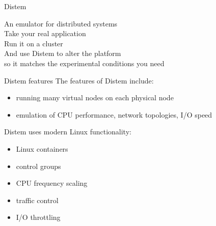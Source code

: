 \documentclass[11pt,xcolor=dvipsnames,presentation]{beamer}
\begin{document}
\begin{frame}[label=sec-2-0-1]{Distem}
\begin{center}
\huge
An emulator for distributed systems\\[0.5em]
\large
Take your \alert{real application}\\[0.5em]
Run it on a \alert{cluster}\\[0.5em]
And use \alert{Distem} to \alert{alter the platform}\\
so it \alert{matches the experimental conditions you need}\\[1em]
\normalsize
{}
\end{center}
\end{frame}


\begin{frame}[label=sec-2-0-2]{Distem features}
The features of Distem include:

\begin{itemize}
\item running many virtual nodes on each physical node
\item emulation of CPU performance, network topologies, I/O speed
\end{itemize}

Distem uses modern Linux functionality:

\begin{itemize}
\item Linux containers
\item control groups
\item CPU frequency scaling
\item traffic control
\item I/O throttling
\end{itemize}
\end{frame}
\end{document}
